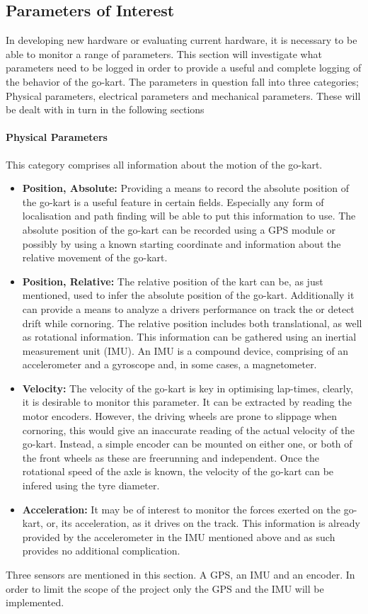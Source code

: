 
\subsection{Parameters of Interest}
\label{sec:parameters}
In developing new hardware or evaluating current hardware, it is necessary to be able to monitor a range of parameters.
This section will investigate what parameters need to be logged in order to provide a useful and complete logging of the behavior of the go-kart.
The parameters in question fall into three categories; Physical parameters, electrical parameters and mechanical parameters.
These will be dealt with in turn in the following sections
\paragraph*{Physical Parameters}
This category comprises all information about the motion of the go-kart.
\begin{itemize}
	\item \textbf{Position, Absolute:} Providing a means to record the absolute position of the go-kart is a useful feature in certain fields.
	Especially any form of localisation and path finding will be able to put this information to use.
	The absolute position of the go-kart can be recorded using a GPS module or possibly by using a known starting coordinate and information about the relative movement of the go-kart.
	\item \textbf{Position, Relative:} The relative position of the kart can be, as just mentioned, used to infer the absolute position of the go-kart.
	Additionally it can provide a means to analyze a drivers performance on track the or detect drift while cornoring.
	The relative position includes both translational, as well as rotational information.
	This information can be gathered using an inertial measurement unit (IMU).
	An IMU is a compound device, comprising of an accelerometer and a gyroscope and, in some cases, a magnetometer.
	\item \textbf{Velocity:} The velocity of the go-kart is key in optimising lap-times, clearly, it is desirable to monitor this parameter.
	It can be extracted by reading the motor encoders.
	However, the driving wheels are prone to slippage when cornoring, this would give an inaccurate reading of the actual velocity of the go-kart.
	Instead, a simple encoder can be mounted on either one, or both of the front wheels as these are freerunning and independent.
	Once the rotational speed of the axle is known, the velocity of the go-kart can be infered using the tyre diameter.
	\item \textbf{Acceleration:} It may be of interest to monitor the forces exerted on the go-kart, or, its acceleration, as it drives on the track.
	This information is already provided by the accelerometer in the IMU mentioned above and as such provides no additional complication.
\end{itemize}
Three sensors are mentioned in this section.
A GPS, an IMU and an encoder.
In order to limit the scope of the project only the GPS and the IMU will be implemented.
